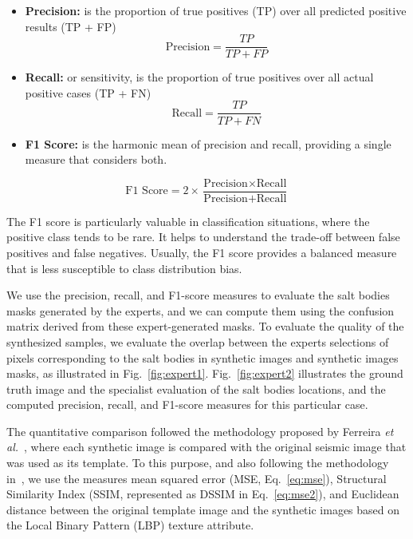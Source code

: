\documentclass{ieeeaccess}
\begin{document}
\begin{itemize}
    \item \textbf{Precision:} is the proportion of true positives (TP) over all predicted positive results (TP + FP)
    \begin{equation}
    \text{Precision} = \frac{TP}{TP + FP}
    \end{equation}

    \item \textbf{Recall:} or sensitivity, is the proportion of true positives over all actual positive cases (TP + FN)
    \begin{equation}
    \text{Recall} = \frac{TP}{TP + FN}
    \end{equation}

    \item \textbf{F1 Score:} is the harmonic mean of precision and recall, providing a single measure that considers both. 

\end{itemize}
    \begin{equation}
    \text{F1 Score} = 2 \times \frac{\text{Precision} \times \text{Recall}}{\text{Precision} + \text{Recall}}
    \end{equation}
    
The F1 score is particularly valuable in classification situations, where the positive class tends to be rare. It helps to understand the trade-off between false positives and false negatives. Usually, the F1 score provides a balanced measure that is less susceptible to class distribution bias.

We use the precision, recall, and F1-score measures to evaluate the salt bodies masks generated by the experts, and we can compute them using the confusion matrix derived from these expert-generated masks. To evaluate the quality of the synthesized samples, we evaluate the overlap between the experts selections of pixels corresponding to the salt bodies in synthetic images and synthetic images masks, as illustrated in Fig.~\ref{fig:expert1}. Fig.~\ref{fig:expert2} illustrates the ground truth image and the specialist evaluation of the salt bodies locations, and the computed precision, recall, and F1-score measures for this particular case.

The quantitative comparison followed the methodology proposed by Ferreira \emph{et al.}~\cite{Ferreira2020}, where each synthetic image is compared with the original seismic image that was used as its template. To this purpose, and also following the methodology in~\cite{Ferreira2020}, we use the measures mean squared error (MSE, Eq.~\ref{eq:mse}), Structural Similarity Index (SSIM, represented as DSSIM in Eq.~\ref{eq:mse2}), and Euclidean distance between the original template image and the synthetic images based on the Local Binary Pattern (LBP) texture attribute.
\end{document}
